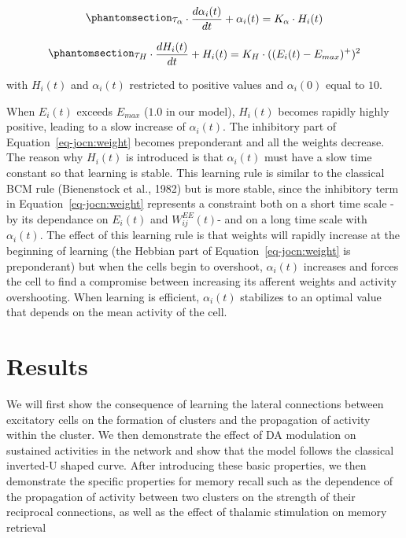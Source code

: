\documentclass[
  11pt,
  a4paper,
]{scrbook}
\begin{document}
\begin{equation}\phantomsection\label{eq-jocn:alpha}{\begin{aligned}
    \tau_{\alpha}  \cdot \frac{d \alpha_{i} (t)}{d t} + \alpha_i (t) = K_\alpha \cdot H_i (t)
    \end{aligned}
}\end{equation}

\begin{equation}\phantomsection\label{eq-jocn:H}{\begin{aligned}
    \tau_H \cdot \frac{d H_{i} (t)}{d t} + H_i (t) = K_H \cdot ( (E_i (t) - E_{max})^+ )^2
    \end{aligned}
}\end{equation}

with \(H_i (t)\) and \(\alpha_i (t)\) restricted to positive values and
\(\alpha_i (0)\) equal to \(10\).

When \(E_i (t)\) exceeds \(E_{max}\) (\(1.0\) in our model), \(H_i (t)\)
becomes rapidly highly positive, leading to a slow increase of
\(\alpha_i (t)\). The inhibitory part of Equation~\ref{eq-jocn:weight}
becomes preponderant and all the weights decrease. The reason why
\(H_i (t)\) is introduced is that \(\alpha_i (t)\) must have a slow time
constant so that learning is stable. This learning rule is similar to
the classical BCM rule (Bienenstock et al., 1982) but is more stable,
since the inhibitory term in Equation~\ref{eq-jocn:weight} represents a
constraint both on a short time scale - by its dependance on \(E_i (t)\)
and \(W^{EE}_{i j} (t)\)- and on a long time scale with
\(\alpha_i (t)\). The effect of this learning rule is that weights will
rapidly increase at the beginning of learning (the Hebbian part of
Equation~\ref{eq-jocn:weight} is preponderant) but when the cells begin
to overshoot, \(\alpha_i (t)\) increases and forces the cell to find a
compromise between increasing its afferent weights and activity
overshooting. When learning is efficient, \(\alpha_i (t)\) stabilizes to
an optimal value that depends on the mean activity of the cell.

\section{Results}\label{results}

We will first show the consequence of learning the lateral connections
between excitatory cells on the formation of clusters and the
propagation of activity within the cluster. We then demonstrate the
effect of DA modulation on sustained activities in the network and show
that the model follows the classical inverted-U shaped curve. After
introducing these basic properties, we then demonstrate the specific
properties for memory recall such as the dependence of the propagation
of activity between two clusters on the strength of their reciprocal
connections, as well as the effect of thalamic stimulation on memory
retrieval
\end{document}
